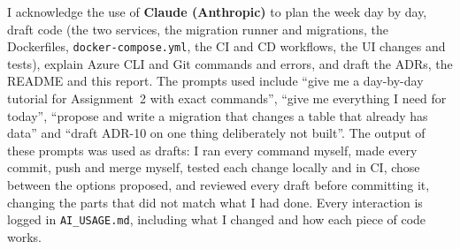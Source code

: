 \documentclass[10pt,a4paper]{article}
\newcommand{\code}[1]{\texttt{#1}}
\begin{document}
I acknowledge the use of \textbf{Claude (Anthropic)} to plan the week day by day, draft code (the two services, the migration runner
and migrations, the Dockerfiles, \code{docker-compose.yml}, the CI and CD workflows, the UI changes and tests), explain Azure CLI and
Git commands and errors, and draft the ADRs, the README and this report. The prompts used include ``give me a day-by-day tutorial
for Assignment~2 with exact commands'', ``give me everything I need for today'', ``propose and write a migration that changes a table that
already has data'' and ``draft ADR-10 on one thing deliberately not built''. The output of these prompts was used as drafts: I ran every
command myself, made every commit, push and merge myself, tested each change locally and in CI, chose between the options proposed,
and reviewed every draft before committing it, changing the parts that did not match what I had done. Every interaction is logged in \code{AI\_USAGE.md},
including what I changed and how each piece of code works.
\end{document}
